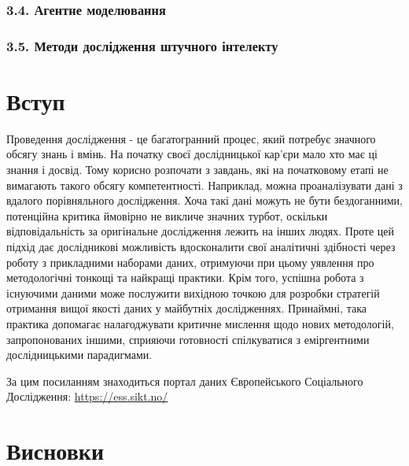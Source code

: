 \documentclass[
  10pt,
  a5paper,
  DIV=11,
  numbers=noendperiod]{scrreprt}
\begin{document}
\subsection*{3.4. Агентне
моделювання}\label{ux430ux433ux435ux43dux442ux43dux435-ux43cux43eux434ux435ux43bux44eux432ux430ux43dux43dux44f}

\subsection*{3.5. Методи дослідження штучного
інтелекту}\label{ux43cux435ux442ux43eux434ux438-ux434ux43eux441ux43bux456ux434ux436ux435ux43dux43dux44f-ux448ux442ux443ux447ux43dux43eux433ux43e-ux456ux43dux442ux435ux43bux435ux43aux442ux443}


\chapter{Вступ}\label{ux432ux441ux442ux443ux43f-1}

Проведення дослідження - це багатогранний процес, який потребує значного
обсягу знань і вмінь. На початку своєї дослідницької кар'єри мало хто
має ці знання і досвід. Тому корисно розпочати з завдань, які на
початковому етапі не вимагають такого обсягу компетентності. Наприклад,
можна проаналізувати дані з вдалого порівняльного дослідження. Хоча такі
дані можуть не бути бездоганними, потенційна критика ймовірно не викличе
значних турбот, оскільки відповідальність за оригінальне дослідження
лежить на інших людях. Проте цей підхід дає дослідникові можливість
вдосконалити свої аналітичні здібності через роботу з прикладними
наборами даних, отримуючи при цьому уявлення про методологічні тонкощі
та найкращі практики. Крім того, успішна робота з існуючими даними може
послужити вихідною точкою для розробки стратегій отримання вищої якості
даних у майбутніх дослідженнях. Принаймні, така практика допомагає
налагоджувати критичне мислення щодо нових методологій, запропонованих
іншими, сприяючи готовності спілкуватися з еміргентними дослідницькими
парадигмами.

За цим посиланням знаходиться портал даних Європейського Соціального
Дослідження: \url{https://ess.sikt.no/}


\chapter{Висновки}\label{ux432ux438ux441ux43dux43eux432ux43aux438}
\end{document}
